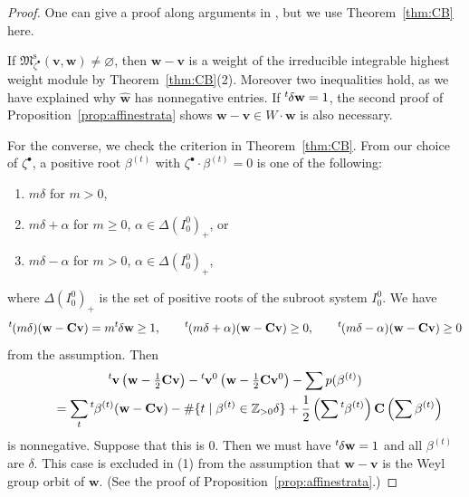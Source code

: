 \documentclass[10pt,a4paper]{amsart}
\newenvironment{aenume}{%
  \begin{enumerate}%
  \renewcommand{\theenumi}{\alph{enumi}}%
  \renewcommand{\labelenumi}{\textup{(\theenumi)}}%
  }{\end{enumerate}}
\theoremstyle{definition}
\numberwithin{equation}{section}
\newcommand{\thmref}[1]{Theorem~\ref{#1}}
\newcommand{\propref}[1]{Proposition~\ref{#1}}
\newcommand{\lsp}[2]{{\mskip-.3mu}{}^{#1}\mskip-1mu{#2}}
\newcommand{\Z}{{\mathbb Z}}
\newcommand{\M}{{\mathfrak M}} %
\newcommand{\Mreg}{\M^{\operatorname{s}}}
\newcommand{\bv}{{\mathbf v}} %
\newcommand{\bw}{{\mathbf w}} %
\newcommand{\bC}{{\mathbf C}} %
\begin{document}
\begin{proof}
One can give a proof along arguments in \cite[10.5, 10.8]{Na-alg}, but
we use \thmref{thm:CB} here.

If $\Mreg_{\zeta^\bullet}(\bv,\bw)\neq \varnothing$, then $\bw - \bv$ is
  a weight of the irreducible integrable highest weight module by
\thmref{thm:CB}(2).
Moreover two inequalities hold, as we have
  explained why $\widehat\bw$ has nonnegative entries.
%
  If $\lsp{t}{\delta}\bw = 1$, the second proof of
  \propref{prop:affinestrata} shows $\bw-\bv\in W\cdot\bw$ is also
  necessary.

  For the converse, we check the criterion in \thmref{thm:CB}. From
  our choice of $\zeta^\bullet$, a positive root $\beta^{(t)}$ with
  $\zeta^\bullet\cdot \beta^{(t)} = 0$ is one of the following:
  \begin{aenume}\itemsep=0pt
    \item $m\delta$ for $m > 0$,
    \item $m\delta + \alpha$ for $m\ge 0$, $\alpha\in
      \Delta(I_0^0)_+$, or
    \item $m\delta - \alpha$ for $m > 0$, $\alpha\in \Delta(I_0^0)_+$,
  \end{aenume}
  where $\Delta(I_0^0)_+$ is the set of positive roots of the subroot
  system $I_0^0$. We have
  \begin{equation*}
    \lsp{t}{(m\delta)} (\bw - \bC \bv) = m\lsp{t}\delta\bw \ge 1, \qquad
    \lsp{t}{(m\delta + \alpha)} (\bw - \bC \bv) \ge 0, \qquad
    \lsp{t}{(m\delta - \alpha)} (\bw - \bC \bv) \ge 0
  \end{equation*}
  from the assumption.
%
  Then
  \begin{gather*}
   \lsp{t}\bv\left(\bw - \tfrac12 \bC \bv\right)
     - \lsp{t}{\bv^0}\left(\bw - \tfrac12\bC\bv^0\right) - \sum p(\beta^{(t)})
\\
 \qquad{}    =    \sum_t \lsp{t}{\beta^{(t)}}(\bw - \bC\bv)
      - \# \{ t \mid \beta^{(t)} \in \Z_{>0}\delta\}
      + \frac12 \left(\sum \lsp{t}{\beta^{(t)}}\right) \bC
       \left(\sum {\beta^{(t)}}\right)
  \end{gather*}
  is nonnegative. Suppose that this is $0$. Then we must have
  $\lsp{t}\delta\bw = 1$ and all $\beta^{(t)}$ are $\delta$. This case
  is excluded in (1) from the assumption that $\bw - \bv$ is the Weyl
  group orbit of $\bw$. (See the proof of \propref{prop:affinestrata}.)
\end{proof}
\end{document}
